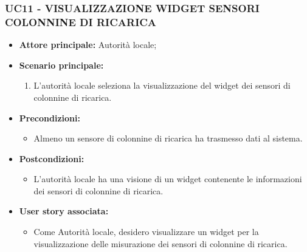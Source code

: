 \subsubsection{UC11 - VISUALIZZAZIONE WIDGET SENSORI COLONNINE DI RICARICA}
\begin{itemize}
    \item \textbf{Attore principale:} Autorità locale;
    \item \textbf{Scenario principale:}
          \begin{enumerate}
              \item L'autorità locale seleziona la visualizzazione del widget dei sensori di colonnine di ricarica.
          \end{enumerate}
    \item \textbf{Precondizioni:}
          \begin{itemize}
              \item  Almeno un sensore di colonnine di ricarica ha trasmesso dati al sistema.
          \end{itemize}
    \item \textbf{Postcondizioni:}
          \begin{itemize}
              \item  L'autorità locale ha una visione di un widget contenente le informazioni dei sensori di colonnine di ricarica.
          \end{itemize}
    \item \textbf{User story associata:}
          \begin{itemize}
              \item Come Autorità locale, desidero visualizzare un widget per la visualizzazione delle misurazione dei sensori di colonnine di ricarica.
          \end{itemize}
\end{itemize}

